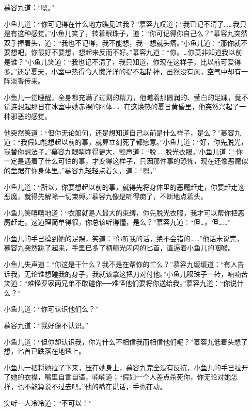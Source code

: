 \documentclass[12pt,oneside]{book}
\begin{document}
慕容九道：``嗯。''

小鱼儿道：``你可记得在什么地方瞧见过我？''慕容九叹道；``我已记不清了\ldots\ldots 我只是有这种感觉。''小鱼儿笑了，转着眼珠子，道：``你可记得你自己么？''慕容九突然双手捧着头，道：``我也不记得，我不能想，我一想就头痛。''小鱼儿道：``那你就不要想吧，你最好不要想，想起来反而不好。''慕容九道：``你。\ldots 你莫非知道我以前是谁？''小鱼儿笑道：``我也记不清了，我只知道，你现在这样子，比以前可爱得多。''还是夏天，小室中热得令人懒洋洋的提不起精神，虽然没有风，空气中却有一阵淡香传来。

小鱼儿一觉睡醒，全身都充满了过剩的精力，他瞧着那圆润的、莹白的足踝，竟不觉连想起那日在冰室中她赤裸的胴体\ldots．在这焕热的夏日黄昏里，他突然兴起了一种邪恶的感觉。

他突然笑道：``但你无论如何，还是想知道自己以前是什么样子，是么？''慕容九道：``我假如能想起以前的事，就算立刻死了都愿意。''小鱼儿道：``好，你先脱光，我替你想法子。''幕容九眼睛睁得更大，颤声道：``脱\ldots\ldots 脱光衣服。''小鱼儿道：``你一定是遇着了什么可怕的事，才变得这样子，只因那件事的恐怖，现在还像恶魔似的盘踞在你身体里。''慕容九轻轻点着头，道：``嗯。''

小鱼儿道：``所以，你要想起以前的事，就得先将身体里的恶魔赶走，你要赶走这恶魔，就得先解除一切束缚。''慕容九像是听得痴了，不断地点着头。

小鱼儿笑嘻嘻地道：``衣服就是人最大的束缚，你先脱光衣服，我才可以帮你把恶魔赶走，这道理简单得很，你总该听得懂，是么？''慕容九道：``但\ldots。但\ldots\ldots{}''

小鱼儿的手已摸到她的足踝，笑道：``你听我的话，绝不会错的\ldots\ldots{}''他话未说完，慕容九突然跳了起来，手里已多了柄精光闪闪的匕首，直逼着小鱼儿的咽喉。

小鱼儿失声道：``你这是干什么？我不是在帮你的忙么？''慕容九缓缓道：``有人告诉我，无论谁想碰我的身子，我就该拿这把刀对付他。''小鱼儿眼珠子一转，喃喃苦笑道：``难怪罗家两兄弟不敢碰你──难怪他们要将你送给我。''慕容九道：``你说什么？''

小鱼儿道：``你可认识他们么？''

慕容九道：``我好像不认识。''

小鱼儿道：``但你却认识我，你为什么不相信我而相信他们呢？''慕容九低着头想了想，匕首已跌落在地毯上。

小鱼儿一把将她拉了下来，压在她身上，慕容九完全没有反抗，小鱼儿的手已拉开了她的衣襟，嘴里自言自语，喃喃道；``假如一个人差点杀死你，你无论对她怎样，也不能算说不过去吧。''他的嘴在说话，手也在动。

突听一人冷冷道：``不可以！''
\end{document}
